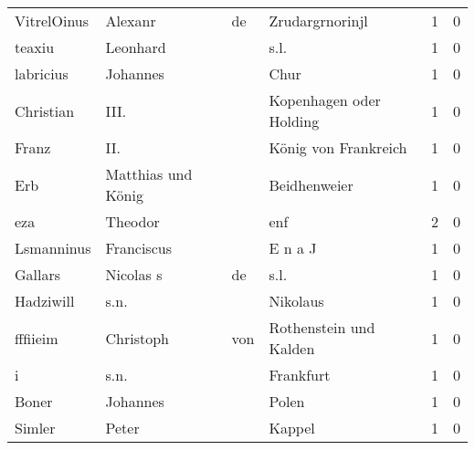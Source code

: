 \begin{center}
\begin{tiny}
\begin{longtabu}{llllrr}
              VitrelOinus &                            Alexanr &          de &                             Zrudargrnorinjl &          1 &         0 \\
                   teaxiu &                           Leonhard &             &                                        s.l. &          1 &         0 \\
                labricius &                           Johannes &             &                                        Chur &          1 &         0 \\
                Christian &                               III. &             &                     Kopenhagen oder Holding &          1 &         0 \\
                    Franz &                                II. &             &                        König von Frankreich &          1 &         0 \\
                      Erb &                 Matthias und König &             &                                Beidhenweier &          1 &         0 \\
                      eza &                            Theodor &             &                                         enf &          2 &         0 \\
               Lsmanninus &                         Franciscus &             &                                     E n a J &          1 &         0 \\
                  Gallars &                          Nicolas s &          de &                                        s.l. &          1 &         0 \\
                Hadziwill &                               s.n. &             &                                    Nikolaus &          1 &         0 \\
                 fffiieim &                          Christoph &         von &                      Rothenstein und Kalden &          1 &         0 \\
                        i &                               s.n. &             &                                   Frankfurt &          1 &         0 \\
                    Boner &                           Johannes &             &                                       Polen &          1 &         0 \\
                   Simler &                              Peter &             &                                      Kappel &          1 &         0 \\

\end{longtabu}
\end{tiny}
\end{center}
